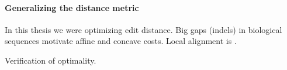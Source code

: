 \paragraph{Generalizing the distance metric}

In this thesis we were optimizing edit distance. 
Big gaps (indels) in biological sequences motivate affine and concave costs. Local alignment is
\cite{arslan2001new}.

Verification of optimality.